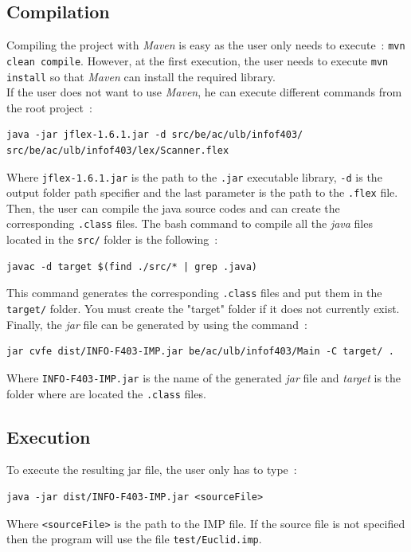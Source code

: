 \documentclass[a4paper,11pt]{article}
\begin{document}
  \subsection{Compilation}
    Compiling the project with \textit{Maven} is easy as the user only needs to execute~: \verb|mvn clean compile|. However, at the first execution, the user needs to execute \verb|mvn install| so that \textit{Maven} can install the required library.\\
    If the user does not want to use \textit{Maven}, he can execute different commands from the root project~:
    \begin{verbatim}
java -jar jflex-1.6.1.jar -d src/be/ac/ulb/infof403/ src/be/ac/ulb/infof403/lex/Scanner.flex
    \end{verbatim}
    Where \verb|jflex-1.6.1.jar| is the path to the \verb|.jar| executable library,  \verb|-d| is the output folder path specifier and the last parameter is the path to the \verb|.flex| file.\\
    Then, the user can compile the java source codes and can create the corresponding \verb|.class| files. The bash command to compile all the \textit{java} files located in the \verb|src/| folder is the following~:
    \begin{verbatim}
javac -d target $(find ./src/* | grep .java)
    \end{verbatim}
    This command generates the corresponding \verb|.class| files and put them in the \verb|target/| folder. You must create the "target" folder if it does not currently exist. Finally, the \textit{jar} file can be generated by using the command~:
    \begin{verbatim}
jar cvfe dist/INFO-F403-IMP.jar be/ac/ulb/infof403/Main -C target/ .
    \end{verbatim}
    Where \verb|INFO-F403-IMP.jar| is the name of the generated \textit{jar} file and \textit{target} is the folder where are located the \verb|.class| files.
    
  \subsection{Execution}
    To execute the resulting jar file, the user only has to type~:
    \begin{verbatim}
java -jar dist/INFO-F403-IMP.jar <sourceFile>
    \end{verbatim}
    Where \verb|<sourceFile>| is the path to the IMP file. If the source file is not specified then the program will use the file \verb|test/Euclid.imp|.
    
\end{document}
